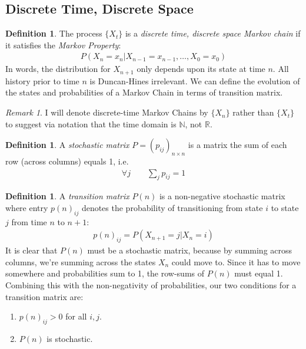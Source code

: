 \documentclass[12pt]{article}
\theoremstyle{plain}
\theoremstyle{definition}
\newtheorem{defn}[thm]{Definition}
\theoremstyle{remark}
\newtheorem*{rmk}{Remark}
\begin{document}
\subsection{Discrete Time, Discrete Space}

\begin{defn}
The process $\{X_t\}$ is a \emph{discrete time, discrete space Markov
chain} if it satisfies the \emph{Markov Property}:
\begin{align*}
  P(X_n = x_n | X_{n-1}=x_{n-1}, \ldots, X_0 =x_0)
\end{align*}
In words, the distribution for $X_{n+1}$ only depends upon its state at
time $n$. All history prior to time $n$ is Duncan-Hines irrelevant.
We can define the evolution of the states and probabilities of a Markov
Chain in terms of transition matrix.
\end{defn}
\begin{rmk}
I will denote discrete-time Markov Chains by $\{X_n\}$ rather than
$\{X_t\}$ to suggest via notation that the time domain is $\mathbb{N}$,
not $\mathbb{R}$.
\end{rmk}

\begin{defn}
A \emph{stochastic matrix} $P=(p_{ij})_{n\times n}$ is a matrix the sum
of each row (across columns) equals 1, i.e.
\begin{align*}
  \forall j \qquad \sum_j p_{ij} = 1
\end{align*}
\end{defn}

\begin{defn}
A \emph{transition matrix} $P(n)$ is a non-negative stochastic matrix
where entry $p(n)_{ij}$ denotes the probability of transitioning from
state $i$ to state $j$ from time $n$ to $n+1$:
\begin{align*}
  p(n)_{ij} = P(X_{n+1}=j | X_n=i)
\end{align*}
It is clear that $P(n)$ must be a stochastic matrix, because by summing
across columns, we're summing across the states $X_n$ could move to.
Since it has to move somewhere and probabilities sum to 1, the row-sums
of $P(n)$ must equal 1. Combining this with the non-negativity of
probabilities, our two conditions for a transition matrix are:
\begin{enumerate}
  \item $p(n)_{ij}>0$ for all $i,j$.
  \item $P(n)$ is stochastic.
\end{enumerate}
\end{defn}
\end{document}
